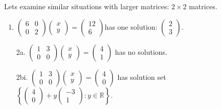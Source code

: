 Lets examine similar situations with larger matrices: $2\times 2$ matrices.
\begin{enumerate}
\item
$\begin{pmatrix}
6	&0 	\\
0 	&2 	
\end{pmatrix} 
\begin{pmatrix}
 x \\ 
y 
\end{pmatrix} 
=
\begin{pmatrix}
12 \\ 
6
\end{pmatrix}$has  one solution: 
$\begin{pmatrix}
2 \\ 
3
\end{pmatrix}.$

\item[2a.] 
$\begin{pmatrix}
1	&3 	\\
0 	&0 	
\end{pmatrix} 
\begin{pmatrix}
 x \\ 
y 
\end{pmatrix} 
=
\begin{pmatrix}
4 \\ 
1 
\end{pmatrix}$ has no solutions.

\item[2bi.]
$\begin{pmatrix}
1	&3 	\\
0 	&0 	
\end{pmatrix} 
\begin{pmatrix}
 x \\ 
y 
\end{pmatrix} 
=
\begin{pmatrix}
4 \\ 
0
\end{pmatrix} $ has solution set 
$\left \{ 
\left(\begin{array}{c}
4 \\ 
0
\end{array} \right)
+
y\left(\begin{array}{c}
-3 \\ 
1
\end{array} \right)
: y\in \mathbb{R} \right\}.$


\end{enumerate}
